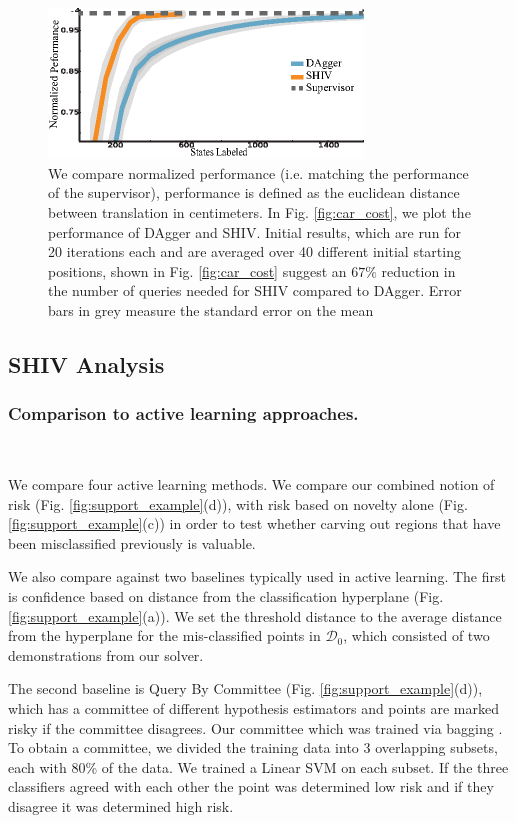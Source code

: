 \documentclass[10pt, conference]{ieeeconf}      %
\begin{document}
\begin{figure}[t!]
\centering
\includegraphics[width=\columnwidth, height=4cm]{figures/needle_insertion_results.eps}
\caption{We compare normalized performance (i.e. matching the performance of the supervisor), performance is defined as the euclidean distance between translation in centimeters. In Fig. \ref{fig:car_cost}, we plot the performance of DAgger and SHIV.  Initial results, which are run for 20 iterations each and are averaged over 40 different initial starting positions, shown in Fig. \ref{fig:car_cost} suggest an $67\%$ reduction in the number of queries needed for SHIV compared to DAgger. Error bars in grey measure the standard error on the mean}
\vspace*{-10pt}
\label{fig:needle}
\end{figure}


\subsection{SHIV Analysis}\label{sec:car}

\subsubsection{Comparison to active learning approaches.}\

 We compare four active learning methods. We compare our combined notion of risk (Fig. \ref{fig:support_example}(d)), with risk based on novelty alone (Fig. \ref{fig:support_example}(c)) in order to test whether carving out regions that have been misclassified previously is valuable. 

We also compare against two baselines typically used in active learning. The first is confidence based on distance from the classification hyperplane \cite{tong2002support} (Fig. \ref{fig:support_example}(a)). We set the threshold distance to the average distance from the hyperplane for the mis-classified points in $\mathcal{D}_0$, which consisted of two demonstrations from our solver. 

The second baseline is Query By Committee (Fig. \ref{fig:support_example}(d)), which has a committee of different hypothesis estimators and points are marked risky if the committee disagrees. Our committee which was trained via bagging \cite{breiman1996bagging}.  To obtain a committee, we divided the training data into 3 overlapping subsets, each with 80\% of the data. We trained a Linear SVM on each subset. If the three classifiers agreed with each other the point was determined low risk and if they disagree it was determined high risk. 
\end{document}
